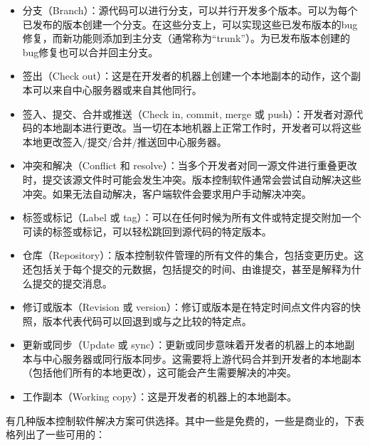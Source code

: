 \begin{itemize}
\item
分支（Branch）：源代码可以进行分支，可以并行开发多个版本。可以为每个已发布的版本创建一个分支。在这些分支上，可以实现这些已发布版本的bug修复，而新功能则添加到主分支（通常称为“trunk”）。为已发布版本创建的bug修复也可以合并回主分支。

\item
签出（Check out）：这是在开发者的机器上创建一个本地副本的动作，这个副本可以来自中心服务器或来自其他同行。

\item
签入、提交、合并或推送（Check in, commit, merge 或 push）：开发者对源代码的本地副本进行更改。当一切在本地机器上正常工作时，开发者可以将这些本地更改签入/提交/合并/推送回中心服务器。

\item
冲突和解决（Conflict 和 resolve）：当多个开发者对同一源文件进行重叠更改时，提交该源文件时可能会发生冲突。版本控制软件通常会尝试自动解决这些冲突。如果无法自动解决，客户端软件会要求用户手动解决冲突。

\item
标签或标记（Label 或 tag）：可以在任何时候为所有文件或特定提交附加一个可读的标签或标记，可以轻松跳回到源代码的特定版本。

\item
仓库（Repository）：版本控制软件管理的所有文件的集合，包括变更历史。这还包括关于每个提交的元数据，包括提交的时间、由谁提交，甚至是解释为什么提交的提交消息。

\item
修订或版本（Revision 或 version）：修订或版本是在特定时间点文件内容的快照，版本代表代码可以回退到或与之比较的特定点。

\item
更新或同步（Update 或 sync）：更新或同步意味着开发者的机器上的本地副本与中心服务器或同行版本同步。这需要将上游代码合并到开发者的本地副本（包括他们所有的本地更改），这可能会产生需要解决的冲突。

\item
工作副本（Working copy）：这是开发者的机器上的本地副本。
\end{itemize}

有几种版本控制软件解决方案可供选择。其中一些是免费的，一些是商业的，下表格列出了一些可用的：

